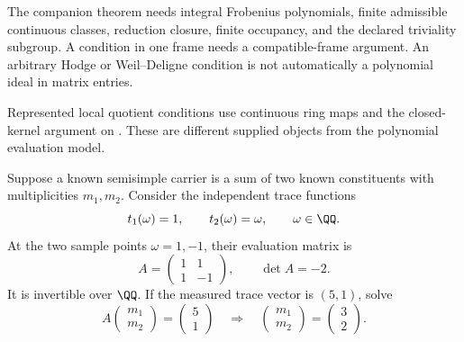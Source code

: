 
The companion theorem needs integral Frobenius polynomials, finite admissible continuous classes, reduction closure, finite occupancy, and the declared triviality subgroup. A condition in one frame needs a compatible-frame argument. An arbitrary Hodge or Weil--Deligne condition is not automatically a polynomial ideal in matrix entries.

Represented local quotient conditions use continuous ring maps and the closed-kernel argument on . These are different supplied objects from the polynomial evaluation model.


Suppose a known semisimple carrier is a sum of two known constituents with multiplicities $m_1,m_2$. Consider the independent trace functions
\[
t_1(\omega)=1,\qquad t_2(\omega)=\omega,\qquad \omega\in\QQ.
\]
At the two sample points $\omega=1,-1$, their evaluation matrix is
\[
A=\begin{pmatrix}1&1\\1&-1\end{pmatrix},\qquad\det A=-2.
\]
It is invertible over $\QQ$. If the measured trace vector is $(5,1)$, solve
\[
A\begin{pmatrix}m_1\\m_2\end{pmatrix}=\begin{pmatrix}5\\1\end{pmatrix}
\quad\Longrightarrow\quad
\begin{pmatrix}m_1\\m_2\end{pmatrix}=\begin{pmatrix}3\\2\end{pmatrix}.
\]

